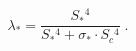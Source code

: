 \begin{equation}
\label{e4:28}
\lambda_{\ast}=\frac{S_{\ast}{}^4}{S_{\ast}{}^4+\sigma_{\ast}\cdot S_c{}^4} \; .
\end{equation}

